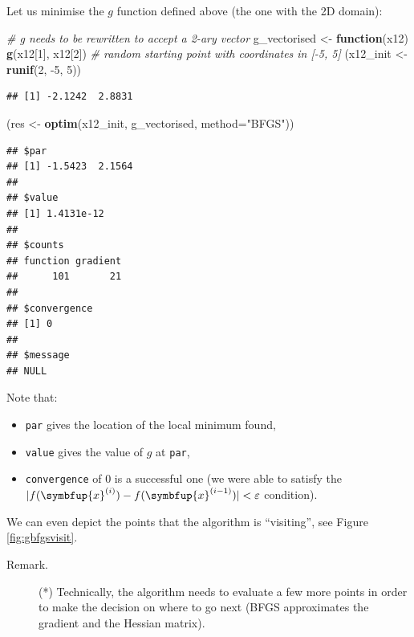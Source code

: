 \documentclass[10pt,b5paper,krantz1]{krantz}
\newenvironment{Shaded}{\begin{snugshade}}{\end{snugshade}}
\newcommand{\CommentTok}[1]{\textcolor[rgb]{0.37,0.37,0.37}{\textit{#1}}}
\newcommand{\ControlFlowTok}[1]{\textcolor[rgb]{0.27,0.27,0.27}{\textbf{#1}}}
\newcommand{\DataTypeTok}[1]{\textcolor[rgb]{0.27,0.27,0.27}{#1}}
\newcommand{\DecValTok}[1]{\textcolor[rgb]{0.06,0.06,0.06}{#1}}
\newcommand{\KeywordTok}[1]{\textcolor[rgb]{0.27,0.27,0.27}{\textbf{#1}}}
\newcommand{\NormalTok}[1]{#1}
\newcommand{\StringTok}[1]{\textcolor[rgb]{0.5,0.5,0.5}{#1}}
\providecommand{\tightlist}{%
  \setlength{\itemsep}{0pt}\setlength{\parskip}{0pt}}
\renewcommand{\mathbf}[1]{\symbfup{#1}}
\begin{document}
Let us minimise the \(g\) function defined above (the one with the 2D domain):

\begin{Shaded}
\begin{Highlighting}[]
\CommentTok{# g needs to be rewritten to accept a 2-ary vector}
\NormalTok{g_vectorised <-}\StringTok{ }\ControlFlowTok{function}\NormalTok{(x12) }\KeywordTok{g}\NormalTok{(x12[}\DecValTok{1}\NormalTok{], x12[}\DecValTok{2}\NormalTok{])}
\CommentTok{# random starting point with coordinates in [-5, 5]}
\NormalTok{(x12_init <-}\StringTok{ }\KeywordTok{runif}\NormalTok{(}\DecValTok{2}\NormalTok{, }\DecValTok{-5}\NormalTok{, }\DecValTok{5}\NormalTok{))}
\end{Highlighting}
\end{Shaded}

\begin{verbatim}
## [1] -2.1242  2.8831
\end{verbatim}

\begin{Shaded}
\begin{Highlighting}[]
\NormalTok{(res <-}\StringTok{ }\KeywordTok{optim}\NormalTok{(x12_init, g_vectorised, }\DataTypeTok{method=}\StringTok{"BFGS"}\NormalTok{))}
\end{Highlighting}
\end{Shaded}

\begin{verbatim}
## $par
## [1] -1.5423  2.1564
## 
## $value
## [1] 1.4131e-12
## 
## $counts
## function gradient 
##      101       21 
## 
## $convergence
## [1] 0
## 
## $message
## NULL
\end{verbatim}

Note that:

\begin{itemize}
\tightlist
\item
  \texttt{par} gives the location of the local minimum found,
\item
  \texttt{value} gives the value of \(g\) at \texttt{par},
\item
  \texttt{convergence} of 0 is a successful one (we were able
  to satisfy the
  \(|f(\mathbf{x}^{(i)})-f(\mathbf{x}^{(i-1)})| < \varepsilon\) condition).
\end{itemize}

We can even depict the points that the algorithm is ``visiting'',
see Figure \ref{fig:gbfgsvisit}.

\begin{description}
\item[Remark.]
(*) Technically, the algorithm needs to evaluate a few more points
in order to make the decision on where to go next (BFGS approximates the
gradient and the Hessian matrix).
\end{description}
\end{document}
